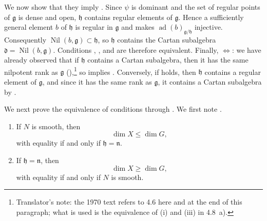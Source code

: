 We now show that they imply . Since \(\psi\) is dominant and the set
of regular points of \(\mathfrak g\) is dense and open, \(\mathfrak h\)
contains regular elements of \(\mathfrak g\). Hence a sufficiently
general element \(b\) of \(\mathfrak h\) is regular in \(\mathfrak g\)
and makes \(\operatorname{ad}(b)_{\mathfrak g/\mathfrak h}\)
injective. Consequently
\(\operatorname{Nil}(b,\mathfrak g)\subset\mathfrak h\), so
\(\mathfrak h\) contains the Cartan subalgebra
\(\mathfrak d=\operatorname{Nil}(b,\mathfrak g)\). Conditions ,
, and  are therefore equivalent. Finally,
\(\Longleftrightarrow\): we have already observed that if
\(\mathfrak h\) contains a Cartan subalgebra, then it has the same
nilpotent rank as \(\mathfrak g\)
(),\footnote{Translator's
note: the 1970 text refers to 4.6 here and at the end of this paragraph;
what is used is the equivalence of (i) and (iii) in 4.8~a).} so  implies .
Conversely, if  holds, then \(\mathfrak h\) contains a regular
element of \(\mathfrak g\), and since it has the same rank as
\(\mathfrak g\), it contains a Cartan subalgebra by .

We next prove the equivalence of conditions  through . We
first note .

\begin{lemma}
\begin{enumerate}
  \item[a)]
  If \(N\) is smooth, then
  \[
    \dim X\leq\dim G,
  \]
  with equality if and only if \(\mathfrak h=\mathfrak n\).

  \item[b)]
  If \(\mathfrak h=\mathfrak n\), then
  \[
    \dim X\geq\dim G,
  \]
  with equality if and only if \(N\) is smooth.
\end{enumerate}
\end{lemma}

